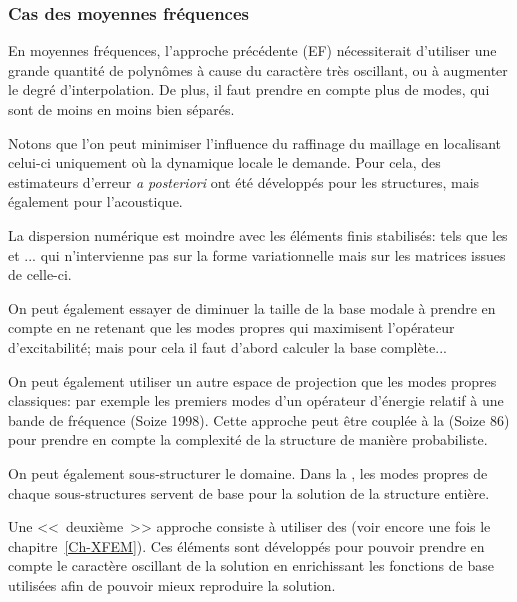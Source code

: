 \medskip
\subsubsection{Cas des moyennes fréquences}
En moyennes fréquences, l'approche précédente (EF) nécessiterait d'utiliser une grande quantité de polynômes
à cause du caractère très oscillant, ou à augmenter le degré d'interpolation. De plus, il faut
prendre en compte plus de modes, qui sont de moins en moins bien séparés.

\medskip
Notons que l'on peut minimiser l'influence du raffinage du maillage en localisant celui-ci uniquement
où la dynamique locale le demande. Pour cela, des estimateurs d'erreur \emph{a posteriori} ont été
développés pour les structures, mais également pour l'acoustique.

La dispersion numérique est moindre avec les éléments finis stabilisés: tels que les  et ...
qui n'intervienne pas sur la forme variationnelle mais sur les matrices issues de celle-ci.

\medskip
On peut également essayer de diminuer la taille de la base modale à prendre en compte en
ne retenant que les modes propres qui maximisent l'opérateur d'excitabilité; mais pour cela
il faut d'abord calculer la base complète...

On peut également utiliser un autre espace de projection que les modes propres classiques:
par exemple les premiers modes d'un opérateur d'énergie relatif à une bande de fréquence
(Soize 1998).
Cette approche peut être couplée à la 
(Soize 86) pour prendre en compte la complexité de la structure de manière probabiliste.

\medskip
On peut également sous-structurer le domaine.
Dans la , les
modes propres de chaque sous-structures servent de base pour la solution
de la structure entière.

\bigskip
Une <<~deuxième~>> approche consiste à utiliser des 
(voir encore une fois le chapitre~\ref{Ch-XFEM}).
Ces éléments sont développés pour pouvoir prendre en compte le caractère
oscillant de la solution en enrichissant les fonctions de base utilisées afin de pouvoir
mieux reproduire la solution.


